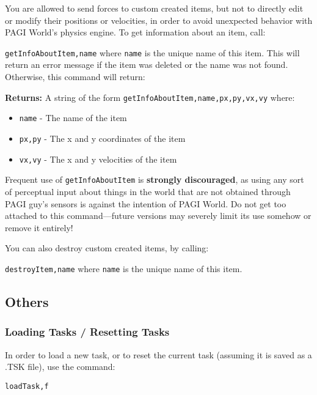 You are allowed to send forces to custom created items, but not to directly edit or modify their positions or velocities, in order to avoid unexpected behavior with PAGI World's physics engine. %
To get information about an item, call:

\texttt{getInfoAboutItem,name} where \texttt{name} is the unique name of this item. This will return an error message if the item was deleted or the name was not found. Otherwise, this command will return:

\noindent \textbf{Returns:} A string of the form \texttt{getInfoAboutItem,name,px,py,vx,vy} where:

\begin{itemize}
\item \texttt{name} - The name of the item
\item \texttt{px,py} - The x and y coordinates of the item
\item \texttt{vx,vy} - The x and y velocities of the item
\end{itemize}

Frequent use of \texttt{getInfoAboutItem} is \textbf{strongly discouraged}, as using any sort of perceptual input about things in the world that are not obtained through PAGI guy's sensors is against the intention of PAGI World. Do not get too attached to this command---future versions may severely limit its use somehow or remove it entirely!

You can also destroy custom created items, by calling:

\texttt{destroyItem,name} where \texttt{name} is the unique name of this item. 

\subsection{Others}

\subsubsection{Loading Tasks / Resetting Tasks}

In order to load a new task, or to reset the current task (assuming it is saved as a .TSK file), use the command:

\texttt{loadTask,f}

